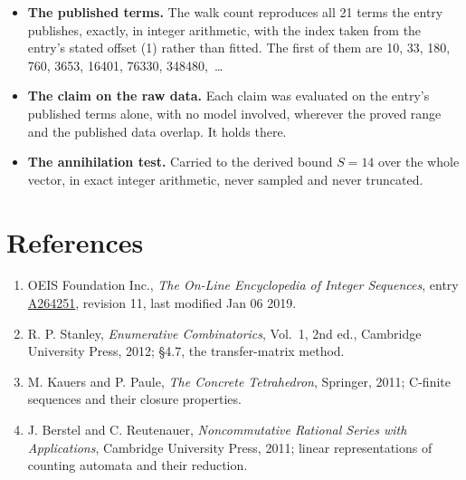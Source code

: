 \documentclass[11pt]{article}
\theoremstyle{definition}
\begin{document}
\begin{itemize}

\item {\bfseries The published terms.} The walk count reproduces all 21 terms the entry publishes, exactly, in integer arithmetic, with the index taken from the entry's stated offset (1) rather than fitted. The first of them are 10, 33, 180, 760, 3653, 16401, 76330, 348480,~\dots

\item {\bfseries The claim on the raw data.} Each claim was evaluated on the entry's published terms alone, with no model involved, wherever the proved range and the published data overlap. It holds there.

\item {\bfseries The annihilation test.} Carried to the derived bound $S = 14$ over the whole vector, in exact integer arithmetic, never sampled and never truncated.

\end{itemize}

\section{References}

\begin{enumerate}

\item OEIS Foundation Inc., \emph{The On-Line Encyclopedia of Integer Sequences}, entry \href{https://oeis.org/A264251}{A264251}, revision 11, last modified Jan 06 2019.

\item R. P. Stanley, \emph{Enumerative Combinatorics}, Vol.~1, 2nd ed., Cambridge University Press, 2012; \S4.7, the transfer-matrix method.

\item M. Kauers and P. Paule, \emph{The Concrete Tetrahedron}, Springer, 2011; C-finite sequences and their closure properties.

\item J. Berstel and C. Reutenauer, \emph{Noncommutative Rational Series with Applications}, Cambridge University Press, 2011; linear representations of counting automata and their reduction.

\end{enumerate}
\end{document}
